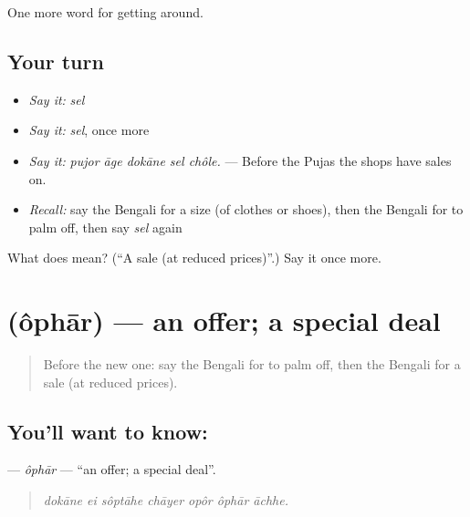 \begin{grammarlens}[title={What you've built}]
One more word for getting around.
\end{grammarlens}

\subsection*{Your turn}
\begin{itemize}
\raggedright
  \item \emph{Say it:} \emph{sel}
  \item \emph{Say it:} \emph{sel}, once more
  \item \emph{Say it:} \emph{pujor āge dokāne sel chôle.} — Before the Pujas the shops have sales on.
  \item \emph{Recall:} say the Bengali for a size (of clothes or shoes), then the Bengali for to palm off, then say \emph{sel} again
\end{itemize}

\begin{tcolorbox}[breakable,colback=teal!4,colframe=teal!35!black,title={Before you move on}]
What does  mean? (\textquotedblleft{}A sale (at reduced prices)\textquotedblright{}.) Say it once more.
\end{tcolorbox}
\section[\texorpdfstring{\bn{অফার} (ôphār)}{অফার (ôphār)}]{ (ôphār) — an offer; a special deal}

\label{lesson:BN-C424-ophar}



\begin{quote}
Before the new one: say the Bengali for to palm off, then the Bengali for a sale (at reduced prices).
\end{quote}

\subsection*{You'll want to know: }
\textbf{} — \emph{ôphār} — \textquotedblleft{}an offer; a special deal\textquotedblright{}.

\begin{quote}
      
\end{quote}

\begin{quote}
\emph{dokāne ei sôptāhe chāyer opôr ôphār āchhe.}
\end{quote}

